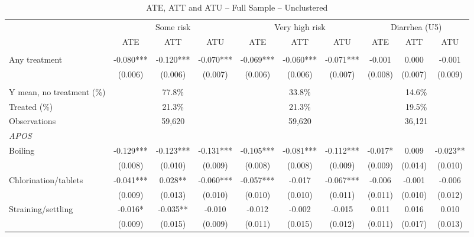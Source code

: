 \begin{table}[htbp]
\centering
\caption{ATE, ATT and ATU -- Full Sample -- Unclustered}
\label{tab:ate-att-atu-iid-aggregated}
\scriptsize
\setlength{\tabcolsep}{4pt}
\renewcommand{\arraystretch}{0.92}
\begin{adjustbox}{max width=\linewidth}
\begin{tabular}{lccccccccc}
\hline\hline
 & \multicolumn{3}{c}{Some risk} & \multicolumn{3}{c}{Very high risk} & \multicolumn{3}{c}{Diarrhea (U5)} \\
\cmidrule(lr){2-4}\cmidrule(lr){5-7}\cmidrule(lr){8-10}
 & ATE & ATT & ATU & ATE & ATT & ATU & ATE & ATT & ATU \\
\addlinespace[3pt]
\multicolumn{10}{l}{\textit{IRM}} \\
Any treatment & -0.080*** & -0.120*** & -0.070*** & -0.069*** & -0.060*** & -0.071*** & -0.001 & 0.000 & -0.001 \\
 & (0.006) & (0.006) & (0.007) & (0.006) & (0.006) & (0.007) & (0.008) & (0.007) & (0.009) \\
\addlinespace[6pt]
\multicolumn{10}{l}{\textit{Descriptive statistics and sample}} \\
Y mean, no treatment (\%) & \multicolumn{3}{c}{77.8\%} & \multicolumn{3}{c}{33.8\%} & \multicolumn{3}{c}{14.6\%} \\
Treated (\%) & \multicolumn{3}{c}{21.3\%} & \multicolumn{3}{c}{21.3\%} & \multicolumn{3}{c}{19.5\%} \\
Observations & \multicolumn{3}{c}{59,620} & \multicolumn{3}{c}{59,620} & \multicolumn{3}{c}{36,121} \\
\midrule
\multicolumn{10}{l}{\textit{APOS}} \\
Boiling & -0.129*** & -0.123*** & -0.131*** & -0.105*** & -0.081*** & -0.112*** & -0.017* & 0.009 & -0.023** \\
 & (0.008) & (0.010) & (0.009) & (0.008) & (0.008) & (0.009) & (0.009) & (0.014) & (0.010) \\
Chlorination/tablets & -0.041*** & 0.028** & -0.060*** & -0.057*** & -0.017 & -0.067*** & -0.006 & -0.001 & -0.006 \\
 & (0.009) & (0.013) & (0.010) & (0.010) & (0.010) & (0.011) & (0.011) & (0.010) & (0.012) \\
Straining/settling & -0.016* & -0.035** & -0.010 & -0.012 & -0.002 & -0.015 & 0.011 & 0.016 & 0.010 \\
 & (0.009) & (0.015) & (0.009) & (0.011) & (0.015) & (0.012) & (0.011) & (0.017) & (0.013) \\

\end{tabular}
\end{adjustbox}
\end{table}
